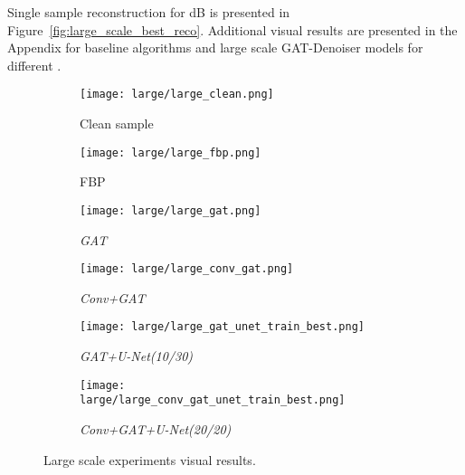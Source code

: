 Single sample reconstruction for  dB is presented in Figure~\ref{fig:large_scale_best_reco}.
Additional visual results are presented in the Appendix for baseline algorithms and large scale GAT-Denoiser models
for different \snry. 

\begin{figure}[H]
  \captionsetup[subfigure]{justification=centering}
  \centering
  \begin{subfigure}[t]{0.16\textwidth}
    \texttt{[image: large/large\_clean.png]}
    \caption{Clean sample}
  \end{subfigure}
  \begin{subfigure}[t]{0.16\textwidth}
    \texttt{[image: large/large\_fbp.png]}
    \caption{FBP}
  \end{subfigure}
  \begin{subfigure}[t]{0.16\textwidth}
    \texttt{[image: large/large\_gat.png]}
    \caption{\textit{GAT}}
  \end{subfigure}
  \begin{subfigure}[t]{0.16\textwidth}
    \texttt{[image: large/large\_conv\_gat.png]}
    \caption{\textit{Conv+GAT}}
  \end{subfigure}
  \begin{subfigure}[t]{0.16\textwidth}
    \texttt{[image: large/large\_gat\_unet\_train\_best.png]}
    \caption{\textit{GAT+U-Net(10/30)}}
  \end{subfigure}
  \begin{subfigure}[t]{0.16\textwidth}
    \texttt{[image: large/large\_conv\_gat\_unet\_train\_best.png]}
    \caption{\textit{Conv+GAT+U-Net(20/20)}}
  \end{subfigure}
  \caption{Large scale experiments visual results.}
\end{figure}

